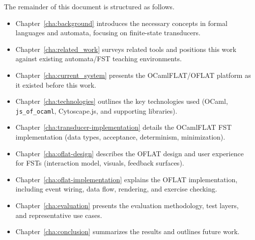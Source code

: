 The remainder of this document is structured as follows. 
\begin{itemize}
  \item Chapter~\ref{cha:background} introduces the necessary concepts in formal languages and automata, focusing on finite-state transducers.
  \item Chapter~\ref{cha:related_work} surveys related tools and positions this work against existing automata/FST teaching environments.
  \item Chapter~\ref{cha:current_system} presents the OCamlFLAT/OFLAT platform as it existed before this work.
  \item Chapter~\ref{cha:technologies} outlines the key technologies used (OCaml, \texttt{js\_of\_ocaml}, Cytoscape.js, and supporting libraries).
  \item Chapter~\ref{cha:transducer-implementation} details the OCamlFLAT FST implementation (data types, acceptance, determinism, minimization).
  \item Chapter~\ref{cha:oflat-design} describes the OFLAT design and user experience for FSTs (interaction model, visuals, feedback surfaces).
  \item Chapter~\ref{cha:oflat-implementation} explains the OFLAT implementation, including event wiring, data flow, rendering, and exercise checking.
  \item Chapter~\ref{cha:evaluation} presents the evaluation methodology, test layers, and representative use cases.
  \item Chapter~\ref{cha:conclusion} summarizes the results and outlines future work.
\end{itemize}

